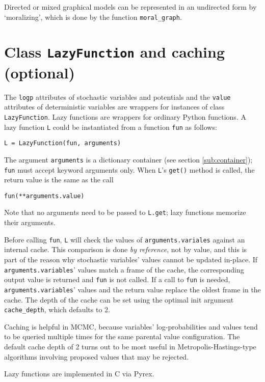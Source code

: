 Directed or mixed graphical models can be represented in an undirected form by `moralizing', which is done by the function \texttt{moral_graph}.

\section{Class \texttt{LazyFunction} and caching (optional)}
\label{sec:caching} 

The \texttt{logp} attributes of stochastic variables and potentials and the \texttt{value} attributes of deterministic variables are wrappers for instances of class \texttt{LazyFunction}. Lazy functions are wrappers for ordinary Python functions. A lazy function \texttt{L} could be instantiated from a function \texttt{fun} as follows:
\begin{verbatim}
L = LazyFunction(fun, arguments)
\end{verbatim}
The argument \texttt{arguments} is a dictionary container (see section \ref{sub:container}); \texttt{fun} must accept keyword arguments only. When \texttt{L}'s \texttt{get()} method is called, the return value is the same as the call 
\begin{verbatim}
fun(**arguments.value)
\end{verbatim}
Note that no arguments need to be passed to \texttt{L.get}; lazy functions memorize their arguments.

Before calling \texttt{fun}, \texttt{L} will check the values of \texttt{arguments.variales} against an internal cache. This comparison is done \emph{by reference}, not by value, and this is part of the reason why stochastic variables' values cannot be updated in-place. If \texttt{arguments.variables}' values match a frame of the cache, the corresponding output value is returned and \texttt{fun} is not called. If a call to \texttt{fun} is needed, \texttt{arguments.variables}' values and the return value replace the oldest frame in the cache. The depth of the cache can be set using the optimal init argument \texttt{cache_depth}, which defaults to 2.

Caching is helpful in MCMC, because variables' log-probabilities and values tend to be queried multiple times for the same parental value configuration. The default cache depth of 2 turns out to be most useful in Metropolis-Hastings-type algorithms involving proposed values that may be rejected.

Lazy functions are implemented in C via Pyrex.